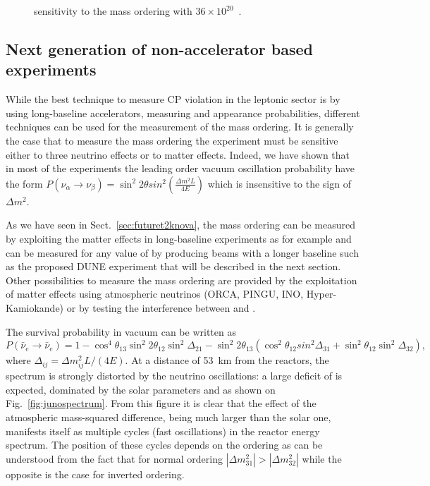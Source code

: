 \begin{figure} [htbp!]
\begin{center}
\caption{\label{fig:novasensi} \nova sensitivity to the mass ordering with $36\times10^{20}$~\pot.}
\end{center}
\end{figure}







\subsection{Next generation of non-accelerator based experiments}

While the best technique to measure CP violation in the leptonic sector is by using long-baseline accelerators, measuring \nue and \nueb appearance probabilities, different techniques can be used for the measurement of the mass ordering.
It is generally the case that to measure the mass ordering the experiment must be sensitive either to three neutrino effects or to matter effects. Indeed, we have shown that in most of the experiments the leading order vacuum oscillation probability have the form $P(\nu_\alpha \rightarrow \nu_\beta) = \sin^2 2 \theta sin^2 (\frac{\Delta m^2 L}{4E})$ which is insensitive to the sign of $\Delta m^2$. 

As we have seen in Sect.~\ref{sec:futuret2knova}, the mass ordering can be measured by exploiting the matter effects in long-baseline experiments as for example \nova and can be measured for any value of \dcp by producing beams with a longer baseline such as the proposed DUNE experiment that will be described in the next section. Other possibilities to measure the mass ordering are provided by the exploitation of matter effects using atmospheric neutrinos (ORCA, PINGU, INO, Hyper-Kamiokande) or by testing the interference between \dmsq and \dmsqtwo.

The survival probability in vacuum can be written as
\begin{equation}
P(\bar{\nu}_e \rightarrow \bar{\nu}_e) = 1 - \cos^4 \theta_{13} \sin^2 2 \theta_{12}  \sin ^2 \Delta_{21}
- \sin^2 2 \theta_{13} (\cos^2  \theta_{12} sin^2 \Delta_{31} + \sin^2  \theta_{12}  \sin^2 \Delta_{32} ),
\end{equation} 
where $\Delta_{ij}= \Delta m^2_{ij} L/(4E)$.
At a distance of 53~km from the reactors, the spectrum is strongly distorted by the neutrino oscillations: a large deficit of \nueb is expected, dominated by the solar parameters \thsol and \dmsqso as shown on Fig.~\ref{fig:junospectrum}. From this figure it is clear that the effect of the atmospheric mass-squared difference, being much larger than the solar one, manifests itself as multiple cycles (fast oscillations) in the reactor energy spectrum. The position of these cycles depends on the ordering as can be understood from the fact that for normal ordering $|\Delta m_{31}^2| > |\Delta m_{32}^2|$ while the opposite is the case for inverted ordering.


